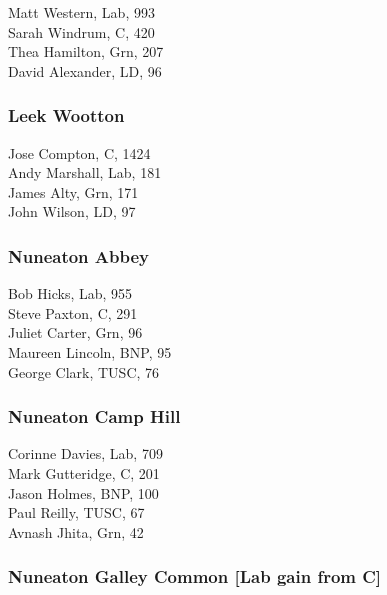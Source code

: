 \documentclass[a4paper,openany,10pt]{book}
\begin{document}


Matt Western, Lab, 993\\
Sarah Windrum, C, 420\\
Thea Hamilton, Grn, 207\\
David Alexander, LD, 96\\


\subsubsection*{Leek Wootton}



Jose Compton, C, 1424\\
Andy Marshall, Lab, 181\\
James Alty, Grn, 171\\
John Wilson, LD, 97\\


\subsubsection*{Nuneaton Abbey}



Bob Hicks, Lab, 955\\
Steve Paxton, C, 291\\
Juliet Carter, Grn, 96\\
Maureen Lincoln, BNP, 95\\
George Clark, TUSC, 76\\


\subsubsection*{Nuneaton Camp Hill}



Corinne Davies, Lab, 709\\
Mark Gutteridge, C, 201\\
Jason Holmes, BNP, 100\\
Paul Reilly, TUSC, 67\\
Avnash Jhita, Grn, 42\\


\subsubsection*{Nuneaton Galley Common \hspace*{\fill}\nolinebreak[1]%
\enspace\hspace*{\fill}
[Lab gain from C]}
\end{document}
